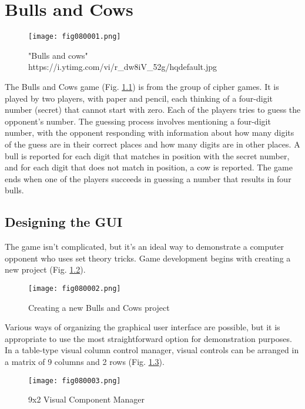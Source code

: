 \chapter{Bulls and Cows}

\begin{figure}[H]
   \centering
   \texttt{[image: fig080001.png]}
   \caption{"Bulls and cows" \\ https://i.ytimg.com/vi/r\_dw8iV\_52g/hqdefault.jpg}
\label{fig080001}
\end{figure}

The Bulls and Cows game (Fig. \ref{fig080001}) is from the group of cipher games. It is played by two players, with paper and pencil, each thinking of a four-digit number (secret) that cannot start with zero. Each of the players tries to guess the opponent's number. The guessing process involves mentioning a four-digit number, with the opponent responding with information about how many digits of the guess are in their correct places and how many digits are in other places. A bull is reported for each digit that matches in position with the secret number, and for each digit that does not match in position, a cow is reported. The game ends when one of the players succeeds in guessing a number that results in four bulls.

\section{Designing the GUI}

The game isn't complicated, but it's an ideal way to demonstrate a computer opponent who uses set theory tricks. Game development begins with creating a new project (Fig. \ref{fig080002}).

\begin{figure}[H]
   \centering
   \texttt{[image: fig080002.png]}
   \caption{Creating a new Bulls and Cows project}
\label{fig080002}
\end{figure}

Various ways of organizing the graphical user interface are possible, but it is appropriate to use the most straightforward option for demonstration purposes. In a table-type visual column control manager, visual controls can be arranged in a matrix of 9 columns and 2 rows (Fig. \ref{fig080003}).

\begin{figure}[H]
   \centering
   \texttt{[image: fig080003.png]}
   \caption{9x2 Visual Component Manager}
\label{fig080003}
\end{figure}

